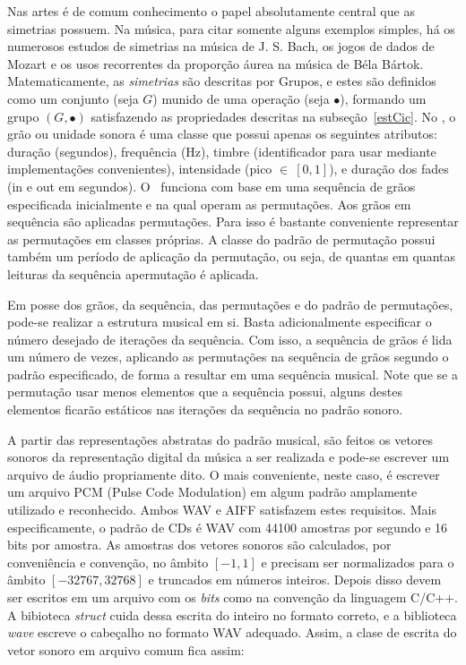 Nas artes é de comum conhecimento o papel absolutamente central
que as simetrias possuem. Na música, para citar somente alguns exemplos simples,
há os numerosos estudos de simetrias na música de J. S. Bach, os jogos
de dados de Mozart e os usos recorrentes da proporção áurea na música
de Béla Bártok. Matematicamente, as \emph{simetrias} são descritas por Grupos,
e estes são definidos como um conjunto (seja $G$)
munido de uma operação (seja $\bullet$), formando um grupo $(G,\bullet)$
satisfazendo as propriedades descritas na subseção~\ref{estCic}.
No \figgus, o grão ou unidade sonora
é uma classe que possui apenas
os seguintes atributos: duração (segundos),
frequência (Hz), timbre (identificador para usar mediante implementações convenientes), intensidade (pico $\in \ [0,1]$), e duração dos fades (in e out em segundos).
O \figgus\ funciona com base em uma sequência de grãos especificada inicialmente e na qual operam as permutações.
Aos grãos em sequência são aplicadas permutações.
Para isso é bastante conveniente representar as permutações em classes próprias.
A classe do padrão de permutação possui também um período de aplicação da permutação, ou seja, de quantas em quantas leituras da sequência apermutação é aplicada.

Em posse dos grãos, da sequência, das permutações e do padrão de permutações, pode-se realizar a estrutura musical em si. Basta adicionalmente especificar o número desejado de iterações da sequência. Com isso, a sequência de grãos é lida um número de vezes, aplicando as permutações na sequência de grãos segundo o padrão especificado, de forma a resultar em uma sequência musical. Note que se a permutação usar menos elementos que a sequência possui, alguns destes elementos ficarão estáticos nas iterações da sequência no padrão sonoro.


A partir das representações abstratas do padrão musical, são feitos os vetores sonoros da representação digital da música a ser realizada e pode-se escrever um arquivo de áudio propriamente dito. O mais conveniente, neste caso, é escrever um arquivo PCM (Pulse Code Modulation) em algum padrão amplamente utilizado e reconhecido. Ambos WAV e AIFF satisfazem estes requisitos. Mais especificamente, o padrão de CDs é WAV com 44100 amostras por segundo e 16 bits por amostra. As amostras dos vetores sonoros são calculados, por conveniência e convenção, no âmbito $[-1,1]$ e precisam ser normalizados para o âmbito $[-32767,32768]$ e truncados em números inteiros. Depois disso devem ser escritos em um arquivo com os \emph{bits} como na convenção da linguagem C/C++. A bibioteca \emph{struct} cuida dessa escrita do inteiro no formato correto, e a biblioteca \emph{wave} escreve o cabeçalho no formato WAV adequado. Assim, a clase de escrita do vetor sonoro em arquivo comum fica assim:

